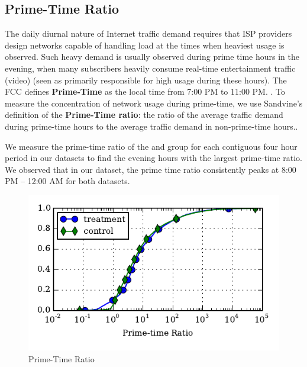 \subsection{Prime-Time Ratio} \label{subsec:primetime}

The daily diurnal nature of Internet traffic demand requires that ISP providers 
design networks capable of handling load at the times when heaviest usage is 
observed. Such heavy demand is usually observed during prime time hours in the 
evening, when many subscribers heavily consume real-time entertainment traffic
(video) (seen as primarily responsible for high usage during these hours). The FCC defines 
\textbf{Prime-Time} as the local time from 7:00 PM to 11:00 PM.
\cite{fcc2014measuring-broadband}. To measure the concentration of network usage
during prime-time, we use Sandvine's definition of the \textbf{Prime-Time 
ratio}: the ratio of the average traffic demand during prime-time hours to the average 
traffic demand in non-prime-time hours.\cite{sandvine20141h, sandvine20142h}.

We measure the prime-time ratio of the \control{} and \treatment{} group
for each contiguous four hour period in our datasets to find the evening hours with
the largest prime-time ratio. We observed that in our dataset,
the prime time ratio consistently peaks at 8:00 PM -- 12:00 AM for both
datasets.

\begin{figure}[t]
\begin{minipage}{1\linewidth}
\centering
\includegraphics[width=1\linewidth]{figures/prime-time-ratio-per-device-cdf-MEAN.pdf}
\caption{Prime-Time Ratio\label{fig:cdf-prime-time-ratio}}
\end{minipage}
\end{figure}

